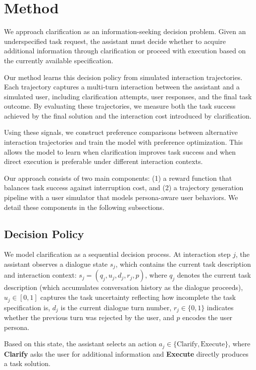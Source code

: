 \section{Method}

We approach clarification as an information-seeking decision problem. 
Given an underspecified task request, the assistant must decide whether to acquire additional information through clarification or proceed with execution based on the currently available specification. 

Our method learns this decision policy from simulated interaction trajectories. 
Each trajectory captures a multi-turn interaction between the assistant and a simulated user, including clarification attempts, user responses, and the final task outcome. 
By evaluating these trajectories, we measure both the task success achieved by the final solution and the interaction cost introduced by clarification.

Using these signals, we construct preference comparisons between alternative interaction trajectories and train the model with preference optimization. This allows the model to learn when clarification improves task success and when direct execution is preferable under different interaction contexts.

Our approach consists of two main components: (1) a reward function that balances task success against interruption cost, and (2) a trajectory generation pipeline with a user simulator that models persona-aware user behaviors. We detail these components in the following subsections.

\subsection{Decision Policy}

We model clarification as a sequential decision process. 
At interaction step $j$, the assistant observes a dialogue state $s_j$, which contains the current task description and interaction context: $s_j = (q_j, u_j, d_j, r_j, p)$, where $q_j$ denotes the current task description (which accumulates conversation history as the dialogue proceeds), $u_j \in [0,1]$ captures the task uncertainty reflecting how incomplete the task specification is, $d_j$ is the current dialogue turn number, $r_j \in \{0,1\}$ indicates whether the previous turn was rejected by the user, and $p$ encodes the user persona.

Based on this state, the assistant selects an action $a_j \in \{\text{Clarify}, \text{Execute}\}$, where \textbf{Clarify} asks the user for additional information and \textbf{Execute} directly produces a task solution.

